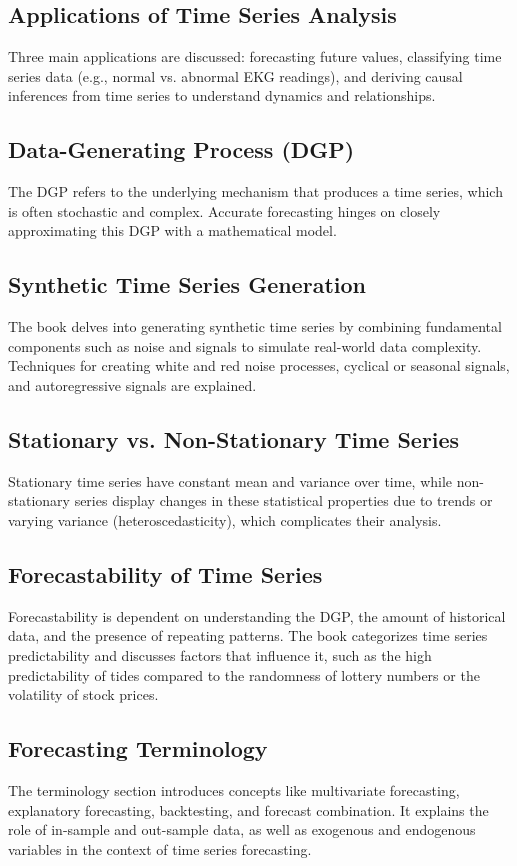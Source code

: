 \documentclass{article}
\begin{document}
\subsection{Applications of Time Series Analysis}
Three main applications are discussed: forecasting future values, classifying time series data (e.g., normal vs. abnormal EKG readings), and deriving causal inferences from time series to understand dynamics and relationships.

\subsection{Data-Generating Process (DGP)}
The DGP refers to the underlying mechanism that produces a time series, which is often stochastic and complex. Accurate forecasting hinges on closely approximating this DGP with a mathematical model.

\subsection{Synthetic Time Series Generation}
The book delves into generating synthetic time series by combining fundamental components such as noise and signals to simulate real-world data complexity. Techniques for creating white and red noise processes, cyclical or seasonal signals, and autoregressive signals are explained.

\subsection{Stationary vs. Non-Stationary Time Series}
Stationary time series have constant mean and variance over time, while non-stationary series display changes in these statistical properties due to trends or varying variance (heteroscedasticity), which complicates their analysis.

\subsection{Forecastability of Time Series}
Forecastability is dependent on understanding the DGP, the amount of historical data, and the presence of repeating patterns. The book categorizes time series predictability and discusses factors that influence it, such as the high predictability of tides compared to the randomness of lottery numbers or the volatility of stock prices.

\subsection{Forecasting Terminology}
The terminology section introduces concepts like multivariate forecasting, explanatory forecasting, backtesting, and forecast combination. It explains the role of in-sample and out-sample data, as well as exogenous and endogenous variables in the context of time series forecasting.
\end{document}
